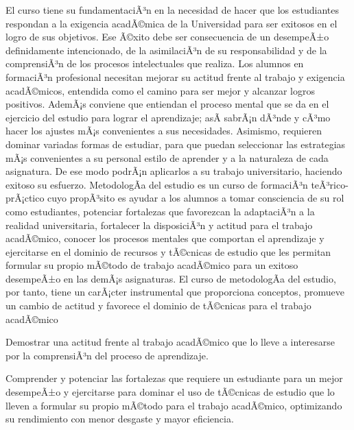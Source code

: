 \begin{syllabus}


\begin{justification}
El curso tiene su fundamentaciÃ³n en la necesidad de hacer que los estudiantes respondan a la exigencia acadÃ©mica de la Universidad para ser exitosos en el logro de sus objetivos. Ese  Ã©xito debe ser consecuencia de un desempeÃ±o definidamente intencionado, de la asimilaciÃ³n de su responsabilidad y de la comprensiÃ³n de los procesos intelectuales que realiza. 
Los alumnos en formaciÃ³n profesional necesitan mejorar su actitud frente al trabajo y exigencia acadÃ©micos, entendida como el camino para ser mejor y alcanzar logros positivos. AdemÃ¡s conviene que entiendan el proceso mental que se da en el ejercicio del estudio para lograr el aprendizaje; asÃ­  sabrÃ¡n dÃ³nde y cÃ³mo hacer los ajustes mÃ¡s convenientes a sus necesidades. Asimismo, requieren dominar variadas formas de estudiar, para que puedan seleccionar las estrategias  mÃ¡s convenientes a su personal estilo de aprender y a la naturaleza de cada asignatura. De ese modo podrÃ¡n  aplicarlos a su trabajo universitario, haciendo exitoso su esfuerzo.
MetodologÃ­a del estudio es un curso de formaciÃ³n teÃ³rico-prÃ¡ctico cuyo propÃ³sito es  ayudar a los alumnos a  tomar consciencia de su rol como estudiantes, potenciar fortalezas que favorezcan la adaptaciÃ³n a la realidad universitaria, fortalecer la disposiciÃ³n y actitud para el trabajo acadÃ©mico, conocer los procesos mentales que comportan el aprendizaje  y ejercitarse en el dominio de recursos y tÃ©cnicas de estudio que les permitan formular su propio mÃ©todo de trabajo acadÃ©mico para un exitoso desempeÃ±o en las demÃ¡s asignaturas. El curso de metodologÃ­a del estudio, por tanto, tiene un carÃ¡cter instrumental que proporciona conceptos, promueve un cambio de actitud y favorece el dominio de tÃ©cnicas para el  trabajo acadÃ©mico

\end{justification}

\begin{goals}
\item Demostrar una actitud frente al trabajo acadÃ©mico que lo lleve a interesarse por la comprensiÃ³n del proceso de aprendizaje.
\item Comprender y potenciar las fortalezas que requiere un estudiante para  un mejor desempeÃ±o  y ejercitarse para dominar el uso de  tÃ©cnicas de estudio que lo lleven a formular su propio mÃ©todo para el trabajo acadÃ©mico, optimizando su rendimiento con menor desgaste y mayor eficiencia.
\end{goals}


\end{syllabus}
